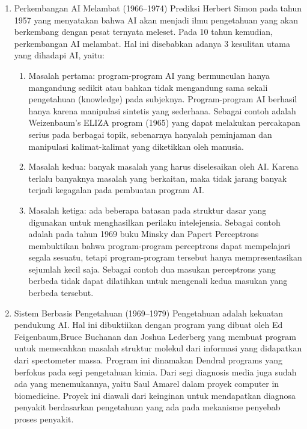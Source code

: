 \documentclass{article}
\begin{document}
\begin{enumerate}
	\item Perkembangan AI Melambat (1966–1974)
	\hfill\break
	Prediksi Herbert Simon pada tahun 1957 yang menyatakan bahwa AI akan menjadi ilmu pengetahuan yang akan berkembang dengan pesat ternyata meleset. Pada 10 tahun kemudian, perkembangan AI melambat. Hal ini disebabkan adanya 3 kesulitan utama yang dihadapi AI, yaitu:
	\begin{enumerate}
		\item Masalah pertama: program-program AI yang bermunculan hanya mangandung sedikit atau bahkan tidak mengandung sama sekali pengetahuan (knowledge) pada subjeknya. Program-program AI berhasil hanya karena manipulasi sintetis yang sederhana. Sebagai contoh adalah Weizenbaum’s ELIZA program (1965) yang dapat melakukan percakapan serius pada berbagai topik, sebenarnya hanyalah peminjaman dan manipulasi kalimat-kalimat yang diketikkan oleh manusia.
		\item Masalah kedua: banyak masalah yang harus diselesaikan oleh AI. Karena terlalu banyaknya masalah yang berkaitan, maka tidak jarang banyak terjadi kegagalan pada pembuatan program AI.
		\item Masalah ketiga: ada beberapa batasan pada struktur dasar yang digunakan untuk menghasilkan perilaku intelejensia. Sebagai contoh adalah pada tahun 1969 buku Minsky dan Papert Perceptrons membuktikan bahwa program-program perceptrons dapat mempelajari segala sesuatu, tetapi program-program tersebut hanya mempresentasikan sejumlah kecil saja. Sebagai contoh dua masukan perceptrons yang berbeda tidak dapat dilatihkan untuk mengenali kedua masukan yang berbeda tersebut.
	\end{enumerate}

	\item Sistem Berbasis Pengetahuan (1969–1979)
	\hfill\break
	Pengetahuan adalah kekuatan pendukung AI. Hal ini dibuktiikan dengan program yang dibuat oleh Ed Feigenbaum,Bruce Buchanan dan Joshua Lederberg yang membuat program untuk memecahkan masalah struktur molekul dari informasi yang didapatkan dari spectometer massa. Program ini dinamakan Dendral programs yang berfokus pada segi pengetahuan kimia. Dari segi diagnosis media juga sudah ada yang menemukannya, yaitu Saul Amarel dalam proyek computer in biomedicine. Proyek ini diawali dari keinginan untuk mendapatkan diagnosa penyakit berdasarkan pengetahuan yang ada pada mekanisme penyebab proses penyakit.


\end{enumerate}
\end{document}

